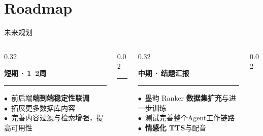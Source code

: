 \documentclass{beamer}
\newcommand{\kw}[1]{\textcolor{importantred}{\textbf{#1}}}
\newcommand{\bignum}[1]{{\fontsize{15}{17}\selectfont\bfseries\color{buptred}#1}}
\newcommand{\bignumG}[1]{{\fontsize{15}{17}\selectfont\bfseries\color{accentgold}#1}}
\newcommand{\redot}{\textcolor{buptred}{\scriptsize$\bullet$}~}
\newcommand{\golddot}{\textcolor{accentgold}{\scriptsize$\bullet$}~}
\begin{document}
\section{Roadmap}

\begin{frame}[t]{未来规划}
    \vspace{0.2cm}
    \footnotesize

    \begin{columns}[T, onlytextwidth]
        \begin{column}[T]{0.32\linewidth}
            \centering\bignum{01}\par\vspace{2pt}
            \centering\textbf{\small 短期\,·\,1--2周}
            \par\vspace{4pt}
            \noindent\textcolor{accentgold!60}{\rule{\linewidth}{0.4pt}}
            \par\vspace{4pt}\raggedright\scriptsize
            \redot 前后端\kw{端到端稳定性联调}\\[3pt]
            \redot 拓展更多数据库内容\\[3pt]
            \redot 完善内容过滤与检索增强，提高可用性
        \end{column}
        \begin{column}[T]{0.02\linewidth}
            \centering\textcolor{accentgold!60}{\rule{0.4pt}{4.6em}}
        \end{column}
        \begin{column}[T]{0.32\linewidth}
            \centering\bignumG{02}\par\vspace{2pt}
            \centering\textbf{\small 中期\,·\,结题汇报}
            \par\vspace{4pt}
            \noindent\textcolor{accentgold!60}{\rule{\linewidth}{0.4pt}}
            \par\vspace{4pt}\raggedright\scriptsize
            \golddot 墨韵 Ranker \kw{数据集扩充}与进一步训练\\[3pt]
            \golddot 测试完善整个Agent工作链路\\[3pt]
            \golddot \textbf{情感化 TTS}与配音
        \end{column}
        \begin{column}[T]{0.02\linewidth}

\end{column}
\end{columns}
\end{frame}
\end{document}
